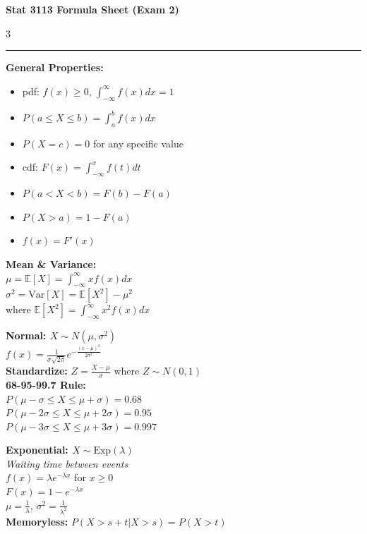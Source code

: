 \documentclass[8pt, letterpaper]{article}
\newcommand{\sectionhead}[1]{%
    \vspace{1.2mm}{\large\bfseries#1}\vspace{0.2mm}\hrule\vspace{0.8mm}%
}
\newcommand{\E}{\mathbb{E}}
\newcommand{\V}{\text{Var}}
\begin{document}
\begin{center}
    {\LARGE\bfseries Stat 3113 Formula Sheet (Exam 2)}
\end{center}

\begin{multicols}{3}

\sectionhead{Continuous RV}
\textbf{General Properties:}
\begin{itemize}
    \item pdf: $f(x) \ge 0$, $\int_{-\infty}^{\infty} f(x)dx = 1$
    \item $P(a \le X \le b) = \int_a^b f(x)dx$
    \item $P(X = c) = 0$ for any specific value
    \item cdf: $F(x) = \int_{-\infty}^x f(t)dt$
    \item $P(a < X < b) = F(b) - F(a)$
    \item $P(X > a) = 1 - F(a)$
    \item $f(x) = F'(x)$
\end{itemize}
\textbf{Mean \& Variance:} \\
$\mu = \E[X] = \int_{-\infty}^{\infty} x f(x)dx$ \\
$\sigma^2 = \V[X] = \E[X^2] - \mu^2$ \\
where $\E[X^2] = \int_{-\infty}^{\infty} x^2 f(x)dx$

\begin{tcolorbox}[colback=gray!10, colframe=black, boxrule=0.3pt, left=1.5mm, right=1.5mm, top=1.5mm, bottom=1.5mm, before skip=1.5mm]
\textbf{Normal: $X \sim N(\mu, \sigma^2)$} \\
$f(x) = \frac{1}{\sigma\sqrt{2\pi}} e^{-\frac{(x-\mu)^2}{2\sigma^2}}$ \\
\textbf{Standardize:} $Z = \frac{X-\mu}{\sigma}$ where $Z \sim N(0,1)$ \\
\textbf{68-95-99.7 Rule:} \\
$P(\mu-\sigma \le X \le \mu+\sigma) = 0.68$ \\
$P(\mu-2\sigma \le X \le \mu+2\sigma) = 0.95$ \\
$P(\mu-3\sigma \le X \le \mu+3\sigma) = 0.997$
\end{tcolorbox}

\begin{tcolorbox}[colback=gray!10, colframe=black, boxrule=0.3pt, left=1.5mm, right=1.5mm, top=1.5mm, bottom=1.5mm, before skip=1.5mm]
\textbf{Exponential: $X \sim \text{Exp}(\lambda)$} \\
\textit{Waiting time between events} \\
$f(x) = \lambda e^{-\lambda x}$ for $x \ge 0$ \\
$F(x) = 1 - e^{-\lambda x}$ \\
$\mu = \frac{1}{\lambda}$, $\sigma^2 = \frac{1}{\lambda^2}$ \\
\textbf{Memoryless:} $P(X > s+t | X > s) = P(X > t)$
\end{tcolorbox}


\end{multicols}
\end{document}
